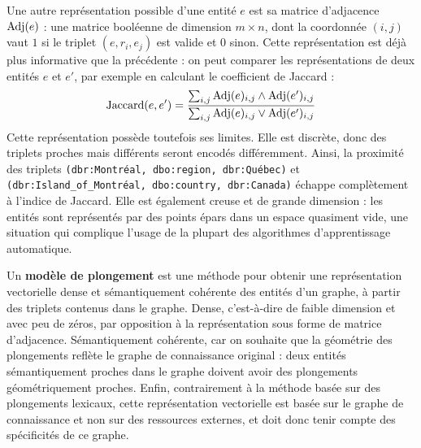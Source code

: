 Une autre représentation possible d'une entité $e$ est sa matrice d'adjacence $\operatorname{Adj}(e)$ \cite{hoser2006semantic}: une matrice booléenne de dimension $m \times n$, dont la coordonnée $(i, j)$ vaut $1$ si le triplet $(e, r_i, e_j)$ est valide et $0$ sinon. Cette représentation est déjà plus informative que la précédente : on peut comparer les représentations de deux entités $e$ et $e'$, par exemple en calculant le coefficient de Jaccard :
\begin{equation}
    \operatorname{Jaccard}(e, e') = \frac{\sum_{i, j} \operatorname{Adj}(e)_{i, j} \land \operatorname{Adj}(e')_{i, j}}{\sum_{i, j} \operatorname{Adj}(e)_{i, j} \lor \operatorname{Adj}(e')_{i, j}}    
\end{equation}
Cette représentation possède toutefois ses limites. Elle est discrète, donc des triplets proches mais différents seront encodés différemment. Ainsi, la proximité des triplets \texttt{(dbr:Montréal, dbo:region, dbr:Québec)} et \texttt{(dbr:Island\_of\_Montréal, dbo:country, dbr:Canada)} échappe complètement à l'indice de Jaccard. Elle est également creuse et de grande dimension : les entités sont représentés par des points épars dans un espace quasiment vide, une situation qui complique l'usage de la plupart des algorithmes d'apprentissage automatique.






Un \textbf{modèle de plongement} est une méthode pour obtenir une représentation vectorielle dense et sémantiquement cohérente des entités d'un graphe, à partir des triplets contenus dans le graphe. Dense, c'est-à-dire de faible dimension et avec peu de zéros, par opposition à la représentation sous forme de matrice d'adjacence. Sémantiquement cohérente, car on souhaite que la géométrie des plongements reflète le graphe de connaissance original : deux entités sémantiquement proches dans le graphe doivent avoir des plongements géométriquement proches. Enfin, contrairement à la méthode basée sur des plongements lexicaux, cette représentation vectorielle est basée sur le graphe de connaissance et non sur des ressources externes, et doit donc tenir compte des spécificités de ce graphe.


